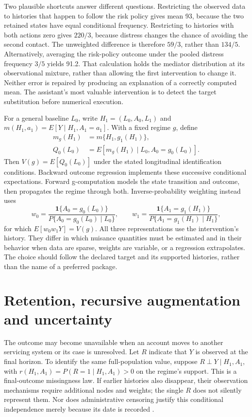 Two plausible shortcuts answer different questions. Restricting the observed
data to histories that happen to follow the risk policy gives mean 93, because
the two retained states have equal conditional frequency. Restricting to
histories with both actions zero gives $220/3$, because distress changes the
chance of avoiding the second contact. The unweighted difference is therefore
$59/3$, rather than $134/5$. Alternatively, averaging the risk-policy outcome
under the pooled distress frequency $3/5$ yields 91.2. That calculation holds
the mediator distribution at its observational mixture, rather than allowing
the first intervention to change it. Neither error is repaired by producing
an explanation of a correctly computed mean. The assistant's most valuable
intervention is to detect the target substitution before numerical execution.

For a general baseline $L_0$, write
$H_1=(L_0,A_0,L_1)$ and
$m(H_1,a_1)=E[Y\mid H_1,A_1=a_1]$. With a fixed regime $g$, define
\begin{align*}
 m_g(H_1)&=m\{H_1,g_1(H_1)\},\\
 Q_0(L_0)&=E[m_g(H_1)\mid L_0,A_0=g_0(L_0)].
\end{align*}
Then $V(g)=E[Q_0(L_0)]$ under the stated longitudinal identification
conditions. Backward outcome regression implements these successive
conditional expectations. Forward g-computation models the state transition
and outcome, then propagates the regime through both. Inverse-probability
weighting instead uses
\[
 w_0=\frac{\mathbf1\{A_0=g_0(L_0)\}}
 {P\{A_0=g_0(L_0)\mid L_0\}},\qquad
 w_1=\frac{\mathbf1\{A_1=g_1(H_1)\}}
 {P\{A_1=g_1(H_1)\mid H_1\}},
\]
for which $E[w_0w_1Y]=V(g)$. All three representations use the intervention's
history. They differ in which nuisance quantities must be estimated and in
their behavior when data are sparse, weights are variable, or a regression
extrapolates. The choice should follow the declared target and its supported
histories, rather than the name of a preferred package.

\section{Retention, recursive augmentation and uncertainty}
\label{exec14:l5-retention}

The outcome may become unavailable when an account moves to another servicing
system or its case is unresolved. Let $R$ indicate that $Y$ is observed at the
final horizon. To identify the same full-population value, suppose
$R\perp Y\mid H_1,A_1$, with
$r(H_1,A_1)=P(R=1\mid H_1,A_1)>0$ on the regime's support. This is a final-outcome
missingness law. If earlier histories also disappear, their observation
mechanisms require additional nodes and weights; the single $R$ does not
silently represent them. Nor does administrative censoring justify this
conditional independence merely because its date is recorded
\cite{hernan2020}.

